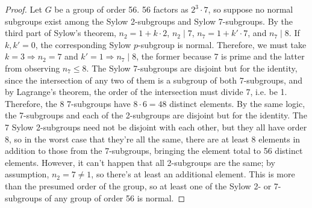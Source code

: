 \documentclass{article}
\begin{document}
\begin{proof}
  Let $G$ be a group of order 56.
  56 factors as $2^{3}\cdot 7$, so suppose no normal subgroups exist among the Sylow 2-subgroups and Sylow 7-subgroups.
  By the third part of Sylow's theorem, $n_{2} = 1 + k \cdot 2$, $n_{2} \mid 7$, $n_{7} = 1 + k' \cdot 7$, and $n_{7} \mid 8$.
  If $k, k' = 0$, the corresponding Sylow $p$-subgroup is normal.
  Therefore, we must take $k = 3 \Rightarrow n_{2} = 7$ and $k' = 1 \Rightarrow n_{7} \mid 8$,
  the former because 7 is prime and the latter from observing $n_{7} \leq 8$.
  The Sylow 7-subgroups are disjoint but for the identity, since the intersection of any two of them is a subgroup of both 7-subgroups,
  and by Lagrange's theorem, the order of the intersection must divide 7, i.e. be 1.
  Therefore, the 8 7-subgroups have $8 \cdot 6 = 48$ distinct elements.
  By the same logic, the 7-subgroups and each of the 2-subgroups are disjoint but for the identity.
  The 7 Sylow 2-subgroups need not be disjoint with each other, but they all have order 8,
  so in the worst case that they're all the same, there are at least 8 elements in addition to those from the 7-subgroups,
  bringing the element total to 56 distinct elements.
  However, it can't happen that all 2-subgroups are the same; by assumption, $n_{2} = 7 \neq 1$, so there's at least an additional element.
  This is more than the presumed order of the group, so at least one of the Sylow 2- or 7-subgroups of any group of order 56 is normal.
\end{proof}
\end{document}
